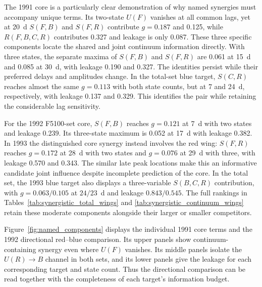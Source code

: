 \documentclass[fleqn,usenatbib]{mnras}
\begin{document}
The 1991 core is a particularly clear demonstration of why named synergies must accompany unique terms. Its two-state $U(F)$ vanishes at all common lags, yet at 20~d $S(F,B)$ and $S(F,R)$ contribute $g=0.187$ and 0.125, while $R(F,B,C,R)$ contributes 0.327 and leakage is only 0.087. These three specific components locate the shared and joint continuum information directly. With three states, the separate maxima of $S(F,B)$ and $S(F,R)$ are 0.061 at 15~d and 0.085 at 30~d, with leakage 0.190 and 0.327. The identities persist while their preferred delays and amplitudes change. In the total-set blue target, $S(C,R)$ reaches almost the same $g=0.113$ with both state counts, but at 7 and 24~d, respectively, with leakage 0.137 and 0.329. This identifies the pair while retaining the considerable lag sensitivity.

For the 1992 F5100-set core, $S(F,B)$ reaches $g=0.121$ at 7~d with two states and leakage 0.239. Its three-state maximum is 0.052 at 17~d with leakage 0.382. In 1993 the distinguished core synergy instead involves the red wing: $S(F,R)$ reaches $g=0.172$ at 28~d with two states and $g=0.076$ at 29~d with three, with leakage 0.570 and 0.343. The similar late peak locations make this an informative candidate joint influence despite incomplete prediction of the core. In the total set, the 1993 blue target also displays a three-variable $S(B,C,R)$ contribution, with $g=0.063/0.105$ at $24/23$~d and leakage $0.843/0.545$. The full rankings in Tables~\ref{tab:synergistic_total_wings} and \ref{tab:synergistic_continuum_wings} retain these moderate components alongside their larger or smaller competitors.

Figure~\ref{fig:named_components} displays the individual 1991 core terms and the 1992 directional red--blue comparison. Its upper panels show continuum-containing synergy even where $U(F)$ vanishes. Its middle panels isolate the $U(R)\to B$ channel in both sets, and its lower panels give the leakage for each corresponding target and state count. Thus the directional comparison can be read together with the completeness of each target's information budget.
\end{document}
